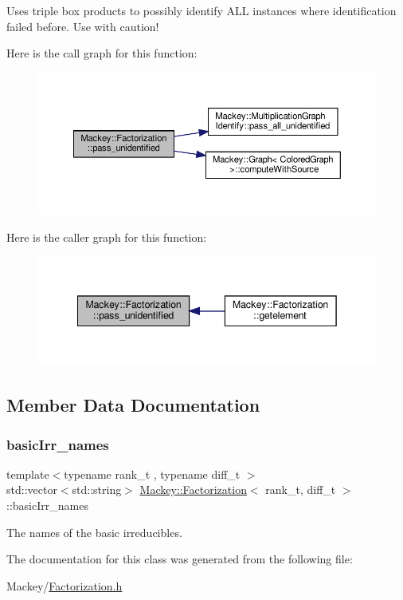 Uses triple box products to possibly identify A\+LL instances where identification failed before. Use with caution! 

Here is the call graph for this function\+:\nopagebreak
\begin{figure}[H]
\begin{center}
\leavevmode
\includegraphics[width=350pt]{classMackey_1_1Factorization_a0f1115a0af9f4fb294646aee85ebb2e4_cgraph}
\end{center}
\end{figure}
Here is the caller graph for this function\+:\nopagebreak
\begin{figure}[H]
\begin{center}
\leavevmode
\includegraphics[width=342pt]{classMackey_1_1Factorization_a0f1115a0af9f4fb294646aee85ebb2e4_icgraph}
\end{center}
\end{figure}


\subsection{Member Data Documentation}
\mbox{\label{classMackey_1_1Factorization_aafee5aadae0d83b75741e0e8c2955625}} 
\subsubsection{\texorpdfstring{basic\+Irr\+\_\+names}{basicIrr\_names}}
{\footnotesize\ttfamily template$<$typename rank\+\_\+t , typename diff\+\_\+t $>$ \\
std\+::vector$<$std\+::string$>$ \hyperlink{classMackey_1_1Factorization}{Mackey\+::\+Factorization}$<$ rank\+\_\+t, diff\+\_\+t $>$\+::basic\+Irr\+\_\+names}



The names of the basic irreducibles. 



The documentation for this class was generated from the following file\+:\begin{DoxyCompactItemize}
\item 
Mackey/\hyperlink{Factorization_8h}{Factorization.\+h}\end{DoxyCompactItemize}
